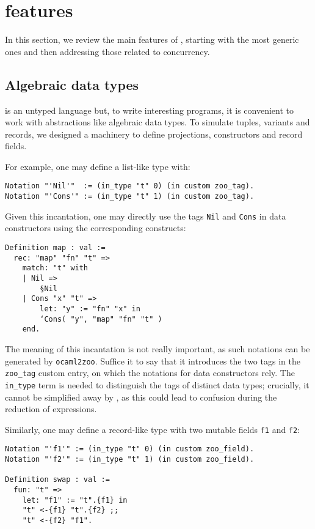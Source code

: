 \section{\Zoo features}
\label{sec:features}

In this section, we review the main features of \Zoo, starting with the most generic ones and then addressing those related to concurrency.

\subsection{Algebraic data types}

\Zoo is an untyped language but, to write interesting programs, it is convenient to work with abstractions like algebraic data types.
To simulate tuples, variants and records, we designed a machinery to define projections, constructors and record fields.

For example, one may define a list-like type with:

\begin{verbatim}
Notation "'Nil'"  := (in_type "t" 0) (in custom zoo_tag).
Notation "'Cons'" := (in_type "t" 1) (in custom zoo_tag).
\end{verbatim}

Given this incantation, one may directly use the tags \texttt{Nil} and \texttt{Cons} in data constructors using the corresponding \ZooLang constructs:

\begin{verbatim}
Definition map : val :=
  rec: "map" "fn" "t" =>
    match: "t" with
    | Nil =>
        §Nil
    | Cons "x" "t" =>
        let: "y" := "fn" "x" in
        ‘Cons( "y", "map" "fn" "t" )
    end.
\end{verbatim}

The meaning of this incantation is not really important, as such notations can be generated by \texttt{ocaml2zoo}.
Suffice it to say that it introduces the two tags in the \texttt{zoo\_tag} custom entry, on which the notations for data constructors rely.
The \texttt{in_type} term is needed to distinguish the tags of distinct data types; crucially, it cannot be simplified away by \Rocq, as this could lead to confusion during the reduction of expressions.

Similarly, one may define a record-like type with two mutable fields \texttt{f1} and \texttt{f2}:

\begin{verbatim}
Notation "'f1'" := (in_type "t" 0) (in custom zoo_field).
Notation "'f2'" := (in_type "t" 1) (in custom zoo_field).

Definition swap : val :=
  fun: "t" =>
    let: "f1" := "t".{f1} in
    "t" <-{f1} "t".{f2} ;;
    "t" <-{f2} "f1".
\end{verbatim}

